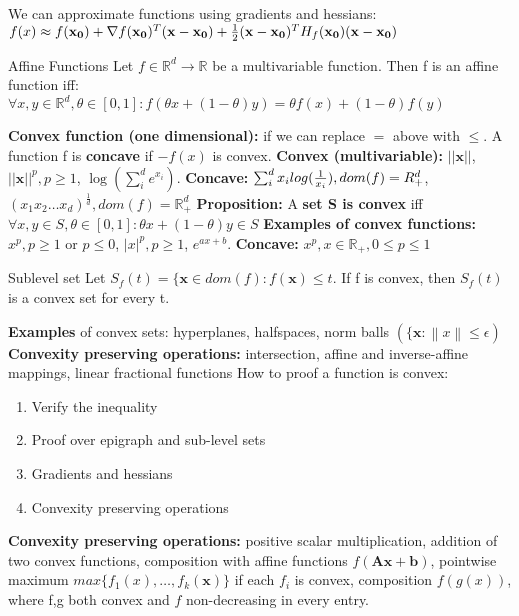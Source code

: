 \documentclass[a4paper]{article}
\begin{document}
We can approximate functions using gradients and hessians:
$
f(x) \approx f(\mathbf{x_0}) + \nabla f(\mathbf{x_0})^T (\mathbf{x-x_0}) +
\newline
 \frac{1}{2}(\mathbf{x-x_0})^T H_f(\mathbf{x_0})(\mathbf{x-x_0})
$

\begin{mainbox}{Affine Functions}
    Let $f\in\mathbb{R}^d \to \mathbb{R}$ be a multivariable function. Then f is an affine function iff:
    $
    \forall x,y\in \mathbb{R}^d, \theta \in [0,1]: f(\theta x + (1-\theta)y) = \theta f(x) + (1-\theta)f(y)
    $
\end{mainbox}
\textbf{Convex function (one dimensional):} if we can replace $=$ above with $\leq$. A function f is \textbf{concave}  if $-f(x)$ is convex.
\newline
\textbf{Convex (multivariable):} $||\mathbf{x}||$, $||\mathbf{x}||^p, p\geq1$, $\log(\sum_i^d e^{x_i})$. \textbf{Concave:} $\sum_i^d x_i log(\frac{1}{x_i}), \newline
dom(f)=R^d_+$, $(x_1 x_2 \dots x_d)^\frac{1}{d}, dom(f)= \mathbb{R}^d_+$      
\newline
\textbf{Proposition:} A \textbf{set S is convex} iff $\forall x,y\in S, \theta\in[0,1]: \theta x + (1-\theta)y \in S$
\newline
\textbf{Examples of convex functions: } $x^p, p \geq 1$ or $p \leq 0$, $|x|^p, p\geq 1$, $e^{ax+b}$. \textbf{Concave:} $x^p, x\in \mathbb{R}_+, 0\leq p \leq 1$        
\begin{subbox}{Sublevel set}
    Let $S_f(t) = \{\mathbf{x} \in dom(f): f(\mathbf{x}) \leq t$. If f is convex, then $S_f(t)$ is a convex set for every t.  
\end{subbox}

\textbf{Examples}  of convex sets: hyperplanes, halfspaces, norm balls $(\{ \mathbf{x}: \left\lVert x \right\rVert \leq \epsilon )$ %
\newline
\textbf{Convexity preserving operations:} intersection, affine and inverse-affine mappings, linear fractional functions 
\newline
How to proof a function is convex:
\begin{enumerate}
    \item Verify the inequality
    \item Proof over epigraph and sub-level sets
    \item Gradients and hessians
    \item Convexity preserving operations
\end{enumerate}
\textbf{Convexity preserving operations:} positive scalar multiplication, addition of two convex functions, composition with affine functions $f(\mathbf{Ax+b})$, pointwise maximum $max\{f_1(x), \dots, f_k(\mathbf{x})\}$ if each $f_i$ is convex, composition $f(g(x))$, where f,g both convex and $f$ non-decreasing in every entry.
\end{document}
